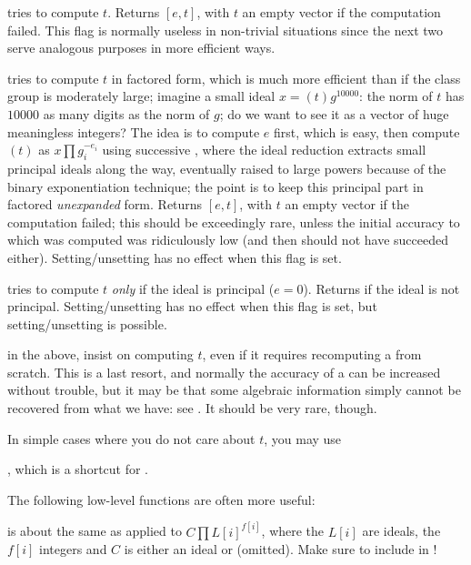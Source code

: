 \item {} tries to compute $t$.
Returns $[e,t]$, with $t$ an empty vector if the computation failed. This
flag is normally useless in non-trivial situations since the next two serve
analogous purposes in more efficient ways.

\item {} tries to compute $t$ in factored form, which is
much more efficient than  if the class group is moderately
large; imagine a small ideal $x = (t)g^{10000}$: the norm of $t$ has $10000$
as many digits as the norm of $g$; do we want to see it as a vector
of huge meaningless integers? The idea is to compute $e$ first, which is
easy, then compute $(t)$ as $x \prod g_i^{-e_i}$ using successive
, where the ideal reduction extracts small principal ideals
along the way, eventually raised to large powers because of the binary
exponentiation technique; the point is to keep this principal part in
factored \emph{unexpanded} form. Returns $[e,t]$, with $t$ an empty vector if
the computation failed; this should be exceedingly rare, unless the initial
accuracy to which  was computed was ridiculously low (and then
 should not have succeeded either). Setting/unsetting
 has no effect when this flag is set.

\item {} tries to compute $t$ \emph{only} if the
ideal is principal ($e = 0$). Returns  if the ideal is not
principal. Setting/unsetting  has no effect when this flag is
set, but setting/unsetting  is possible.

\item {} in the above, insist on computing $t$, even if it
requires recomputing a  from scratch. This is a last resort, and
normally the accuracy of a  can be increased without trouble, but it
may be that some algebraic information simply cannot be recovered from what
we have: see . It should be very rare, though.

In simple cases where you do not care about $t$, you may use

, which is a shortcut for
.

The following low-level functions are often more useful:

 is
about the same as  applied to $C \prod L[i]^{f[i]}$,
where the $L[i]$ are ideals, the $f[i]$ integers and $C$ is either an ideal
or  (omitted). Make sure to include  in !

